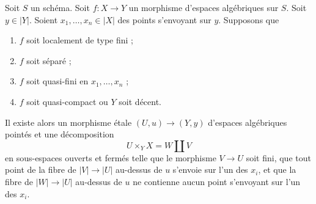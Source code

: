 \begin{lemma}
\label{lemma-etale-splits-off-quasi-finite-part}
Soit $S$ un schéma.
Soit $f : X \to Y$ un morphisme d'espaces algébriques sur $S$.
Soit $y \in |Y|$. Soient $x_1, \ldots, x_n \in |X|$ des points s'envoyant sur $y$.
Supposons que
\begin{enumerate}
\item $f$ soit localement de type fini ;
\item $f$ soit séparé ;
\item $f$ soit quasi-fini en $x_1, \ldots, x_n$ ;
\item $f$ soit quasi-compact ou $Y$ soit décent.
\end{enumerate}
Il existe alors un morphisme étale $(U, u) \to (Y, y)$
d'espaces algébriques pointés et une décomposition
$$
U \times_Y X = W \amalg V
$$
en sous-espaces ouverts et fermés telle que le morphisme $V \to U$ soit fini,
que tout point de la fibre de $|V| \to |U|$ au-dessus de $u$ s'envoie sur l'un des $x_i$,
et que la fibre de $|W| \to |U|$ au-dessus de $u$ ne contienne aucun point
s'envoyant sur l'un des $x_i$.
\end{lemma}

